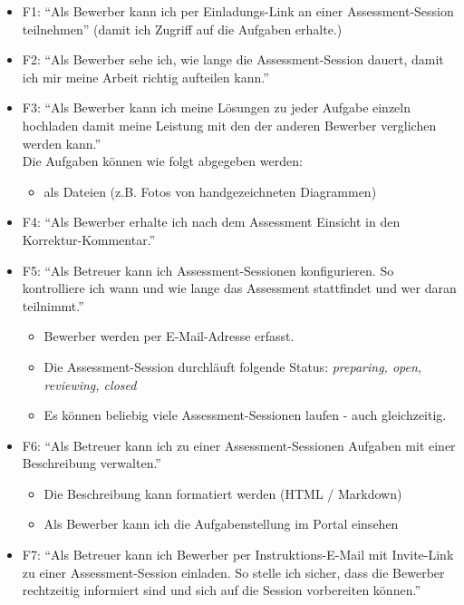 \begin{itemize}
    \item F1: \enquote{Als Bewerber kann ich per Einladungs-Link an einer Assessment-Session teilnehmen} (damit ich Zugriff auf die Aufgaben erhalte.)
    \item F2: \enquote{Als Bewerber sehe ich, wie lange die Assessment-Session dauert, damit ich mir meine Arbeit richtig aufteilen kann.}
    \item F3: \enquote{Als Bewerber kann ich meine Lösungen zu jeder Aufgabe einzeln hochladen damit meine Leistung mit den der anderen Bewerber verglichen werden kann.}
          \\Die Aufgaben können wie folgt abgegeben werden:
          \begin{itemize}
              \item als Dateien (z.B. Fotos von handgezeichneten Diagrammen)
          \end{itemize}
    \item F4: \enquote{Als Bewerber erhalte ich nach dem Assessment Einsicht in den Korrektur-Kommentar.}
    \item F5: \enquote{Als Betreuer kann ich Assessment-Sessionen konfigurieren. So kontrolliere ich wann und wie lange das Assessment stattfindet und wer daran teilnimmt.}
          \begin{itemize}
              \item Bewerber werden per E-Mail-Adresse erfasst.
              \item Die Assessment-Session durchläuft folgende Status: \emph{preparing, open, reviewing, closed}
              \item Es können beliebig viele Assessment-Sessionen laufen - auch gleichzeitig.
          \end{itemize}
    \item F6: \enquote{Als Betreuer kann ich zu einer Assessment-Sessionen Aufgaben mit einer Beschreibung verwalten.}
          \begin{itemize}
              \item Die Beschreibung kann formatiert werden (HTML / Markdown)
              \item Als Bewerber kann ich die Aufgabenstellung im Portal einsehen
          \end{itemize}
    \item F7: \enquote{Als Betreuer kann ich Bewerber per Instruktions-E-Mail mit Invite-Link zu einer Assessment-Session einladen. So stelle ich sicher, dass die Bewerber rechtzeitig informiert sind und sich auf die Session vorbereiten können.}

\end{itemize}
